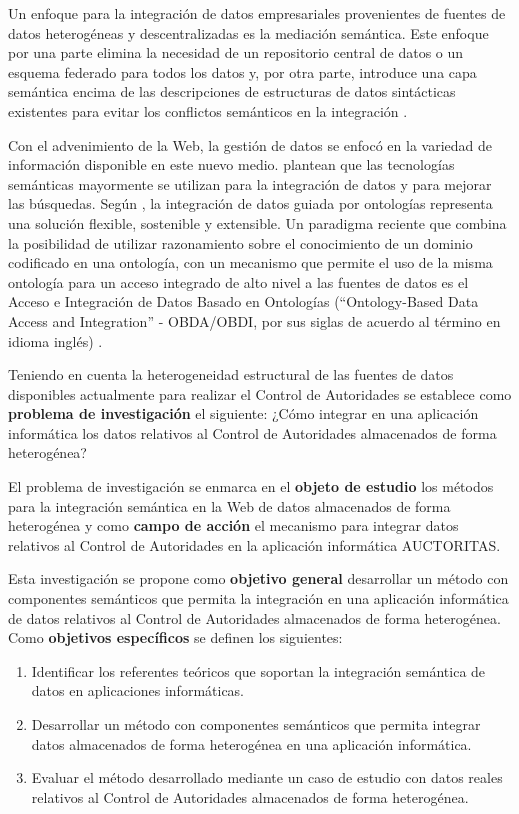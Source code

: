 Un enfoque para la integración de datos empresariales provenientes de fuentes de datos heterogéneas y descentralizadas es la mediación semántica. Este enfoque por una parte elimina la necesidad de un repositorio central de datos o un esquema federado para todos los datos y, por otra parte, introduce una capa semántica encima de las descripciones de estructuras de datos sintácticas existentes para evitar los conflictos semánticos en la integración \citep{ElKadiri2015}. 

Con el advenimiento de la Web, la gestión de datos se enfocó en la variedad de información disponible en este nuevo medio. \cite{Janev2011} plantean que las tecnologías semánticas mayormente se utilizan para la integración de datos y para mejorar las búsquedas. Según \citep{Hoang2014}, la integración de datos guiada por ontologías representa una solución flexible, sostenible y extensible. Un paradigma reciente que combina la posibilidad de utilizar razonamiento sobre el conocimiento de un dominio codificado en una ontología, con un mecanismo que permite el uso de la misma ontología para un acceso integrado de alto nivel a las fuentes de datos es el Acceso e Integración de Datos Basado en Ontologías (``Ontology-Based Data Access and Integration'' - OBDA/OBDI, por sus siglas de acuerdo al término en idioma inglés) \citep{Calvanese2016,Calvanese2017}.

Teniendo en cuenta la heterogeneidad estructural de las fuentes de datos disponibles actualmente para realizar el Control de Autoridades se establece como \textbf{problema de investigación} el siguiente: ¿Cómo integrar en una aplicación informática los datos relativos al Control de Autoridades almacenados de forma heterogénea?

El problema de investigación se enmarca en el \textbf{objeto de estudio} los métodos para la integración semántica en la Web de datos almacenados de forma heterogénea y como \textbf{campo de acción} el mecanismo para integrar datos relativos al Control de Autoridades en la aplicación informática AUCTORITAS.

Esta investigación se propone como \textbf{objetivo general} desarrollar un método con componentes semánticos que permita la integración en una aplicación informática de datos relativos al Control de Autoridades almacenados de forma heterogénea. Como \textbf{objetivos específicos} se definen los siguientes:

\begin{enumerate}
\item Identificar los referentes teóricos que soportan la integración semántica de datos en aplicaciones informáticas.
\item Desarrollar un método con componentes semánticos que permita integrar datos almacenados de forma heterogénea en una aplicación informática.
\item Evaluar el método desarrollado mediante un caso de estudio con datos reales relativos al Control de Autoridades almacenados de forma heterogénea.
\end{enumerate}

